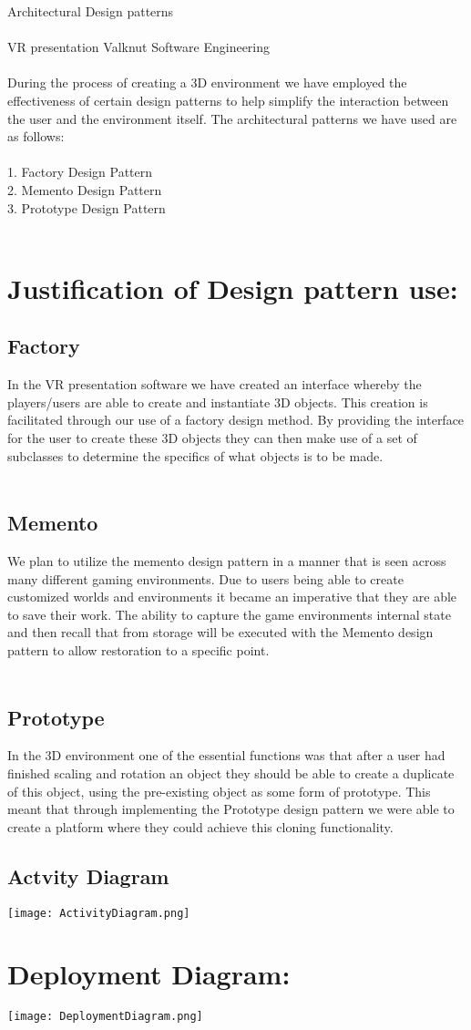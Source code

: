 {\Large Architectural Design patterns} \\\\
 VR presentation Valknut Software Engineering \\\\
During the process of creating a 3D environment we have employed the effectiveness of certain design patterns to help simplify the interaction between the user and the environment itself. The architectural patterns we have used are as follows:\\\\
1.	Factory Design Pattern\\
2.	Memento Design Pattern\\
3.	Prototype Design Pattern\\\\
	\section{Justification of Design pattern use:}
	\subsection{Factory}
	In the VR presentation software we have created an interface whereby the players/users are able to create and instantiate 3D objects. This creation is facilitated through our use of a factory design method. By providing the interface for the user to create these 3D objects they can then make use of a set of subclasses to determine the specifics of what objects is to be made.\\\\
	\subsection{Memento}
	We plan to utilize the memento design pattern in a manner that is seen across many different gaming environments. Due to users being able to create customized worlds and environments it became an imperative that they are able to save their work. The ability to capture the game environments internal state and then recall that from storage will be executed with the Memento design pattern to allow restoration to a specific point.\\\\
	\subsection{Prototype}
	In the 3D environment one of the essential functions was that after a user had finished scaling and rotation an object they should be able to create a duplicate of this object, using the pre-existing object as some form of prototype. This meant that through implementing the Prototype design pattern we were able to create a platform where they could achieve this cloning functionality.
  	\subsection{Actvity Diagram}
	\texttt{[image: ActivityDiagram.png]}
	
	\section{Deployment Diagram:}	
	\texttt{[image: DeploymentDiagram.png]}
